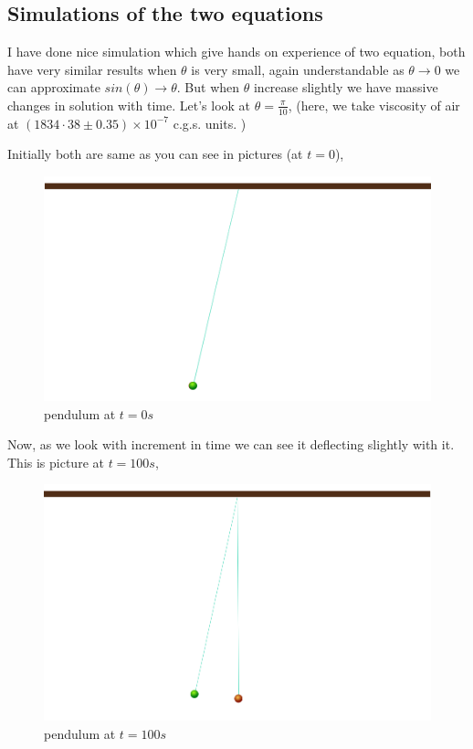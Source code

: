 \documentclass[11pt,a4paper]{article}
\begin{document}
\subsection{Simulations of the two equations}
\label{sec:orga364d7b}

I have done nice simulation which give hands on experience of two equation, both have very similar results when \(\theta\) is very small, again understandable as \(\theta \to 0\) we can approximate \(sin(\theta) \to \theta\). But when \(\theta\) increase slightly we have massive changes in solution with time. Let's look at \(\theta = \frac{\pi}{10}\), (here, we take viscosity of air at \((1834·38\pm0.35)\times10^{−7}\) c.g.s. units. \cite{majumdar1938coefficient})

Initially both are same as you can see in pictures (at \(t=0\)),
\begin{figure}[htbp]
\centering
\includegraphics[width=0.8 \textwidth]{t0.png}
\caption{\label{fig:orgd6fedb6}pendulum at \(t=0s\)}
\end{figure}

Now, as we look with increment in time we can see it deflecting slightly with it. This is picture at \(t = 100s\),
\begin{figure}[htbp]
\centering
\includegraphics[width=0.8 \textwidth]{t100.png}
\caption{\label{fig:org13c368e}pendulum at \(t=100s\)}
\end{figure}
\end{document}
